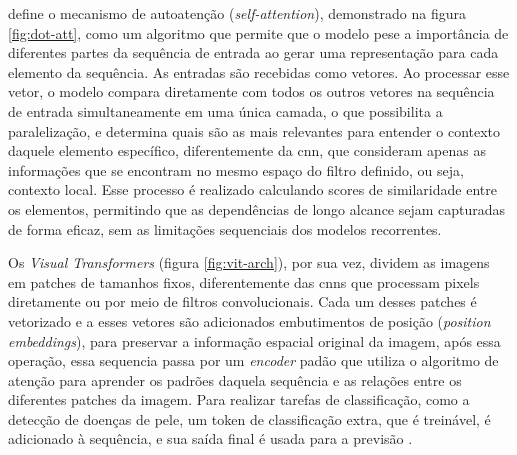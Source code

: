  define o mecanismo de autoatenção (\textit{self-attention}), demonstrado na figura \ref{fig:dot-att}, como um algoritmo que permite que o modelo pese a importância de diferentes partes da sequência de entrada ao gerar uma representação para cada elemento da sequência. As entradas são recebidas como vetores. Ao processar esse vetor, o modelo compara diretamente com todos os outros vetores na sequência de entrada simultaneamente em uma única camada, o que possibilita a paralelização, e determina quais são as mais relevantes para entender o contexto daquele elemento específico, diferentemente da \gls{cnn}, que consideram apenas as informações que se encontram no mesmo espaço do filtro definido, ou seja, contexto local. 
 Esse processo é realizado calculando scores de similaridade entre os elementos, permitindo que as dependências de longo alcance sejam capturadas de forma eficaz, sem as limitações sequenciais dos modelos recorrentes.

%
  
Os \textit{Visual Transformers} (figura \ref{fig:vit-arch}), por sua vez, dividem as imagens em patches de tamanhos fixos, diferentemente das \gls{cnn}s que processam pixels diretamente ou por meio de filtros convolucionais. Cada um desses patches é vetorizado e a esses vetores são adicionados embutimentos de posição (\textit{position embeddings}), para preservar a informação espacial original da imagem, após essa operação, essa sequencia passa por um \textit{encoder} padão que utiliza o algoritmo de atenção para aprender os padrões daquela sequência e as relações entre os diferentes patches da imagem. Para realizar tarefas de classificação, como a detecção de doenças de pele, um token de classificação extra, que é treinável, é adicionado à sequência, e sua saída final é usada para a previsão \cite{Dosovitskiy}.
\newline
\newline
\newline

